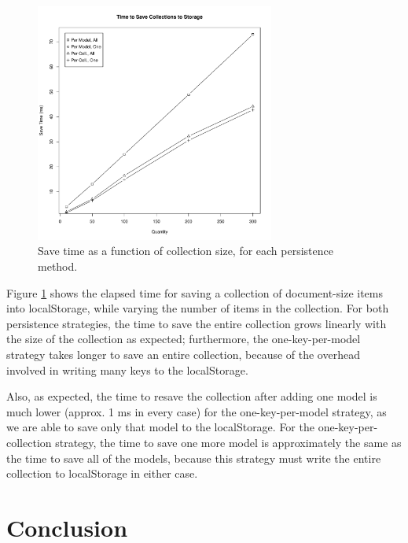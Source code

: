 \documentclass[12pt]{article}
\begin{document}
\begin{figure}[th]
    \centering
    \includegraphics[width=0.7\textwidth]{save.pdf}
    \caption{Save time as a function of collection size, for each persistence
    method.}
    \label{fig:save}
\end{figure}

Figure \ref{fig:save} shows the elapsed time for saving a collection of
document-size items into localStorage, while varying the number of items in the
collection. For both persistence strategies, the time to save the entire
collection grows linearly with the size of the collection as expected;
furthermore, the one-key-per-model strategy takes longer to save an entire
collection, because of the overhead involved in writing many keys to the
localStorage.

Also, as expected, the time to resave the collection after adding one model is
much lower (approx. 1 ms in every case) for the one-key-per-model strategy, as
we are able to save only that model to the localStorage. For the
one-key-per-collection strategy, the time to save one more model is
approximately the same as the time to save all of the models, because this
strategy must write the entire collection to localStorage in either case.

\section{Conclusion}
\end{document}
